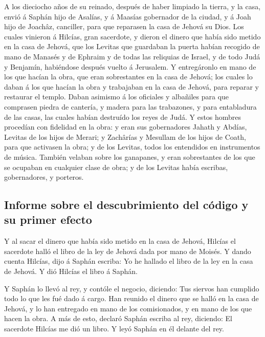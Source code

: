  A los dieciocho años de su reinado, después de haber
limpiado la tierra, y la casa, envió á Saphán hijo de Asalías, y á
Maasías gobernador de la ciudad, y á Joah hijo de Joachâz, canciller,
para que reparasen la casa de Jehová su Dios.  Los cuales
vinieron á Hilcías, gran sacerdote, y dieron el dinero que había sido
metido en la casa de Jehová, que los Levitas que guardaban la puerta
habían recogido de mano de Manasés y de Ephraim y de todas las reliquias
de Israel, y de todo Judá y Benjamín, habiéndose después vuelto á
Jerusalem.  Y entregáronlo en mano de los que hacían la
obra, que eran sobrestantes en la casa de Jehová; los cuales lo daban á
los que hacían la obra y trabajaban en la casa de Jehová, para reparar y
restaurar el templo.  Daban asimismo á los oficiales y
albañiles para que comprasen piedra de cantería, y madera para las
trabazones, y para entabladura de las casas, las cuales habían destruído
los reyes de Judá.  Y estos hombres procedían con
fidelidad en la obra: y eran sus gobernadores Jahath y Abdías, Levitas
de los hijos de Merari; y Zachârías y Mesullam de los hijos de Coath,
para que activasen la obra; y de los Levitas, todos los entendidos en
instrumentos de música.  También velaban sobre los
ganapanes, y eran sobrestantes de los que se ocupaban en cualquier clase
de obra; y de los Levitas había escribas, gobernadores, y porteros.

\hypertarget{informe-sobre-el-descubrimiento-del-cuxf3digo-y-su-primer-efecto}{%
\subsection{Informe sobre el descubrimiento del código y su primer
efecto}\label{informe-sobre-el-descubrimiento-del-cuxf3digo-y-su-primer-efecto}}

 Y al sacar el dinero que había sido metido en la casa de
Jehová, Hilcías el sacerdote halló el libro de la ley de Jehová dada por
mano de Moisés.  Y dando cuenta Hilcías, dijo á Saphán
escriba: Yo he hallado el libro de la ley en la casa de Jehová. Y dió
Hilcías el libro á Saphán.

 Y Saphán lo llevó al rey, y contóle el negocio,
diciendo: Tus siervos han cumplido todo lo que les fué dado á cargo.
 Han reunido el dinero que se halló en la casa de Jehová,
y lo han entregado en mano de los comisionados, y en mano de los que
hacen la obra.  A más de esto, declaró Saphán escriba al
rey, diciendo: El sacerdote Hilcías me dió un libro. Y leyó Saphán en él
delante del rey.

